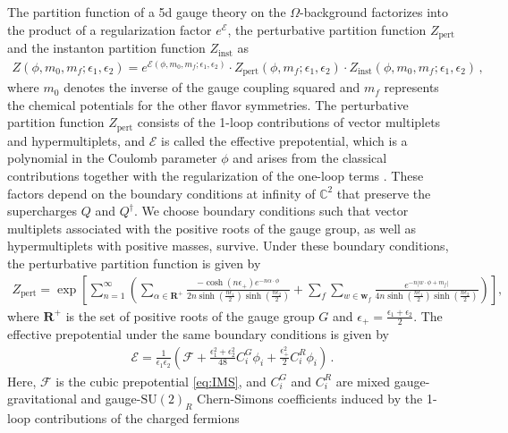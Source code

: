 \documentclass[11pt, a4paper]{article}
\theoremstyle{definition}
\begin{document}
The partition function of a 5d gauge theory on the $ \Omega $-background factorizes into the product of a regularization factor $ e^{\mathcal{E}} $, the perturbative partition function $ Z_{\mathrm{pert}} $ and the instanton partition function $ Z_{\mathrm{inst}} $ as
\begin{align}\label{eq:Z-factor}
    Z(\phi, m_0, m_f; \epsilon_1, \epsilon_2) = e^{\mathcal{E}(\phi, m_0, m_f; \epsilon_1, \epsilon_2)} \cdot Z_{\mathrm{pert}}(\phi,m_f;\epsilon_1,\epsilon_2) \cdot Z_{\mathrm{inst}}(\phi,m_0,m_f; \epsilon_1,\epsilon_2) \, ,
\end{align}
where $ m_0 $ denotes the inverse of the gauge coupling squared and $ m_f $ represents the chemical potentials for the other flavor symmetries. The perturbative partition function $ Z_{\mathrm{pert}} $ consists of the 1-loop contributions of vector multiplets and hypermultiplets, and $ \mathcal{E} $ is called the effective prepotential, which is a polynomial in the Coulomb parameter $ \phi $ and arises from the classical contributions together with the regularization of the one-loop terms \cite{Kim:2020hhh}. These factors depend on the boundary conditions at infinity of $ \mathbb{C}^2 $ that preserve the supercharges $ Q $ and $ Q^\dagger $. We choose boundary conditions such that vector multiplets associated with the positive roots of the gauge group, as well as hypermultiplets with positive masses, survive. Under these boundary conditions, the perturbative partition function is given by
\begin{align}\label{eq:pertZ}
    Z_{\mathrm{pert}} = \exp\!\left[ \sum_{n=1}^\infty \! \left( \sum_{\alpha \in \mathbf{R}^+} \frac{-\cosh(n\epsilon_+) e^{-n\alpha \cdot \phi}}{2n\sinh(\frac{n\epsilon_1}{2}) \sinh(\frac{n \epsilon_2}{2})} + \sum_f \sum_{w\in \mathbf{w}_f} \frac{e^{-n|w\cdot \phi+m_f|}}{4n\sinh(\frac{n\epsilon_1}{2}) \sinh(\frac{n \epsilon_2}{2})} \right)\! \right] \!,
\end{align}
where $ \mathbf{R}^+ $ is the set of positive roots of the gauge group $ G $ and $ \epsilon_+ = \frac{\epsilon_1+\epsilon_2}{2} $. The effective prepotential under the same boundary conditions is given by
\begin{align}\label{eq:effprep}
    \mathcal{E} = \frac{1}{\epsilon_1 \epsilon_2} \left( \mathcal{F} + \frac{\epsilon_1^2+\epsilon_2^2}{48} C_i^G \phi_i + \frac{\epsilon_+^2}{2} C_i^R \phi_i \right) \, .
\end{align}
Here, $ \mathcal{F} $ is the cubic prepotential \eqref{eq:IMS}, and $ C_i^G $ and $ C_i^R $ are mixed gauge-gravitational and gauge-$ \mathrm{SU}(2)_R $ Chern-Simons coefficients induced by the 1-loop contributions of the charged fermions \cite{Bonetti:2013ela, Grimm:2015zea, BenettiGenolini:2019zth}
\end{document}
